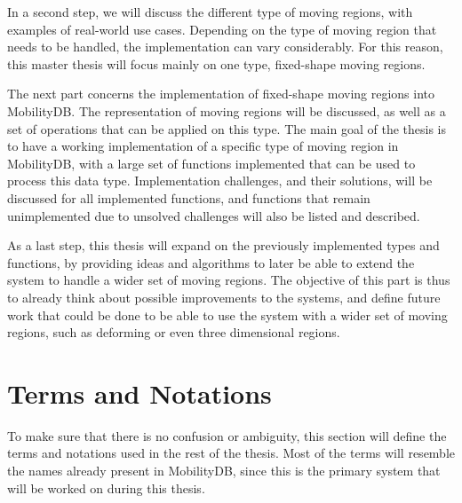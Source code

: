 In a second step, we will discuss the different type of moving regions, with examples of real-world use cases. Depending on the type of moving region that needs to be handled, the implementation can vary considerably. For this reason, this master thesis will focus mainly on one type, fixed-shape moving regions.

The next part concerns the implementation of fixed-shape moving regions into MobilityDB. The representation of moving regions will be discussed, as well as a set of operations that can be applied on this type. The main goal of the thesis is to have a working implementation of a specific type of moving region in MobilityDB, with a large set of functions implemented that can be used to process this data type. Implementation challenges, and their solutions, will be discussed for all implemented functions, and functions that remain unimplemented due to unsolved challenges will also be listed and described.

As a last step, this thesis will expand on the previously implemented types and functions, by providing ideas and algorithms to later be able to extend the system to handle a wider set of moving regions. The objective of this part is thus to already think about possible improvements to the systems, and define future work that could be done to be able to use the system with a wider set of moving regions, such as deforming or even three dimensional regions.

\section{Terms and Notations}

To make sure that there is no confusion or ambiguity, this section will define the terms and notations used in the rest of the thesis. Most of the terms will resemble the names already present in MobilityDB, since this is the primary system that will be worked on during this thesis.

